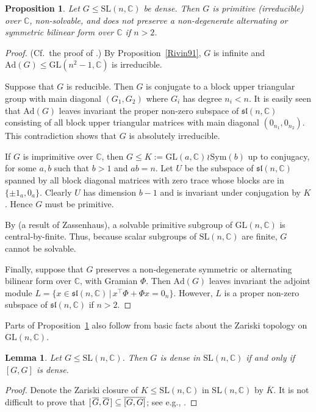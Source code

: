 \documentclass[11pt]{amsart}
\newtheorem{lemma}[theorem]{Lemma}
\newtheorem{proposition}[theorem]{Proposition}
\theoremstyle{definition}
\theoremstyle{remark}
\newcommand{\C}{\mathbb{C}}
\newcommand{\GL}{\mathrm{GL}}
\newcommand{\SL}{\mathrm{SL}}
\newcommand{\Ad}{\mathrm{Ad}}
\begin{document}
\begin{proposition} 
\label{AdjModule}
Let $G\leq \SL(n,\C)$ be dense. Then $G$ is primitive (irreducible) over $\C$, 
non-solvable, and does not preserve a non-degenerate alternating 
or symmetric bilinear form over $\C$ if $n>2$.
\end{proposition}
\begin{proof}
(Cf.~the proof of \cite[Proposition~2.1]{SAT}.)
By Proposition~\ref{Rivin91}, $G$ is infinite and 
$\Ad(G)\leq \GL(n^2-1,\C)$ is irreducible.

Suppose that $G$ is reducible.
Then $G$ is conjugate to a block upper triangular group with main diagonal 
$(G_1, G_2)$ where $G_i$ has degree $n_i<n$. It is easily seen that $\Ad(G)$ 
leaves invariant the proper non-zero subspace of $\mathfrak{sl}(n, \C)$ 
consisting of all block upper triangular matrices with main diagonal 
$(0_{n_1},0_{n_2})$.
This contradiction shows that $G$ is absolutely irreducible.

If $G$ is imprimitive over $\C$, then $G\leq K:= 
\allowbreak \GL(a,\C) \hspace{1pt} \wr \hspace{1pt} 
\mathrm{Sym}(b)$ up to conjugacy, for some 
$a, \allowbreak b$ such that $b>1$ and $ab=n$.
Let $U$ be the subspace of $\mathfrak{sl}(n,\C)$ 
spanned by all block diagonal matrices with zero trace 
whose blocks are in $\{\pm 1_a,0_a\}$. Clearly $U$ has 
dimension $b-1$ and is invariant under conjugation by
 $K$. Hence $G$ must be primitive.

By \cite[3.4]{Wehrfritz} (a result of Zassenhaus), a 
solvable primitive subgroup of $\GL(n,\C)$ is 
central-by-finite. Thus, because scalar subgroups of
$\SL(n,\C)$ are finite, $G$ cannot be solvable.

Finally, suppose that $G$  preserves a non-degenerate 
symmetric or alternating bilinear form over $\C$, with
Gramian $\Phi$. Then 
$\Ad(G)$ leaves invariant the adjoint module 
$L= \allowbreak
\{ x\in \mathfrak{sl}(n,\C) \, | \, \allowbreak
x^\top\Phi +\Phi x = 0_n\}$.
 However, $L$ is a proper non-zero subspace of 
$\mathfrak{sl}(n,\C)$ if $n>2$. 
\end{proof}

Parts of Proposition~\ref{AdjModule} also follow from basic 
facts about the Zariski topology on $\GL(n,\C)$.
\begin{lemma}
\label{DerivDense}
Let  $G\leq \SL(n,\C)$. Then $G$ is dense in $\SL(n,\C)$ 
if and only if $[G,G]$ is dense.
\end{lemma}
\begin{proof}
Denote the Zariski closure of $K\leq \SL(n,\C)$ in $\SL(n,\C)$ 
by $\overline{K}$. It is not difficult  to prove that 
$[\hspace{1.25pt} \overline{G}, \overline{G}\hspace{1.25pt} ] 
\subseteq \overline{[G,G]}$; see e.g., \cite[5.10]{Wehrfritz}.
\end{proof}
\end{document}
